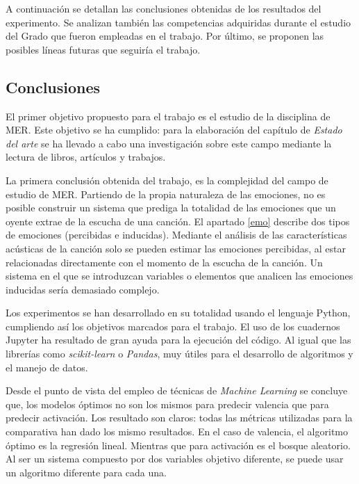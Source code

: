 \documentclass[12pt,a4paper]{article}
\begin{document}
A continuación se detallan las conclusiones obtenidas de los resultados del experimento. Se analizan también las competencias adquiridas durante el estudio del Grado que fueron empleadas en el trabajo. Por último, se proponen las posibles líneas futuras que seguiría el trabajo.

 
\subsection{Conclusiones}
El primer objetivo propuesto para el trabajo es el estudio de la disciplina de MER. Este objetivo se ha cumplido: para la elaboración del capítulo de \textit{Estado del arte} se ha llevado a cabo una investigación sobre este campo mediante la lectura de libros, artículos y trabajos.


La primera conclusión obtenida del trabajo, es la complejidad del campo de estudio de MER. Partiendo de la propia naturaleza de las emociones, no es posible construir un sistema que prediga la totalidad de las emociones que un oyente extrae de la escucha de una canción. El apartado \ref{emo} describe dos tipos de emociones (percibidas e inducidas). Mediante el análisis de las características acústicas de la canción solo se pueden estimar las emociones percibidas, al estar relacionadas directamente con el momento de la escucha de la canción. Un sistema en el que se introduzcan variables o elementos que analicen las emociones inducidas sería demasiado complejo.


Los experimentos se han desarrollado en su totalidad usando el lenguaje Python, cumpliendo así los objetivos marcados para el trabajo. El uso de los cuadernos Jupyter ha resultado de gran ayuda para la ejecución del código. Al igual que las librerías como \textit{scikit-learn} o \textit{Pandas}, muy útiles para el desarrollo de algoritmos y el manejo de datos.


Desde el punto de vista del empleo de técnicas de \textit{Machine Learning} se concluye que, los modelos óptimos no son los mismos para predecir valencia que para predecir activación. Los resultado son claros: todas las métricas utilizadas para la comparativa han dado los mismo resultados. En el caso de valencia, el algoritmo óptimo es la regresión lineal. Mientras que para activación es el bosque aleatorio.  Al ser un sistema compuesto por dos variables objetivo diferente, se puede usar un algoritmo diferente para cada una.
\end{document}
